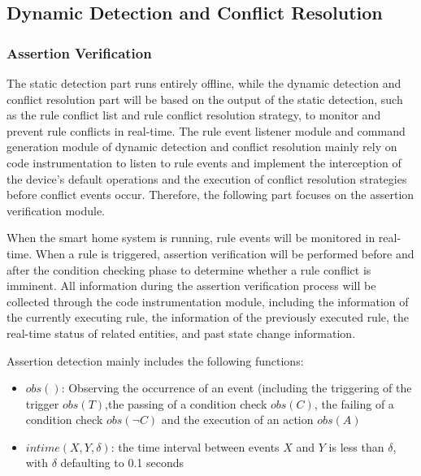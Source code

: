 \subsection{Dynamic Detection and Conflict Resolution}
\subsubsection{Assertion Verification}
The static detection part runs entirely offline, while the dynamic detection and conflict resolution part will be based on the output of the static detection, such as the rule conflict list and rule conflict resolution strategy, to monitor and prevent rule conflicts in real-time. The rule event listener module and command generation module of dynamic detection and conflict resolution mainly rely on code instrumentation to listen to rule events and implement the interception of the device's default operations and the execution of conflict resolution strategies before conflict events occur. Therefore, the following part focuses on the assertion verification module.

When the smart home system is running, rule events will be monitored in real-time. When a rule is triggered, assertion verification will be performed before and after the condition checking phase to determine whether a rule conflict is imminent. All information during the assertion verification process will be collected through the code instrumentation module, including the information of the currently executing rule, the information of the previously executed rule, the real-time status of related entities, and past state change information.

Assertion detection mainly includes the following functions:

\begin{itemize}
	\item $obs()$: Observing the occurrence of an event (including the triggering of the trigger $obs(T)$,the passing of a condition check $obs(C)$, the failing of a condition check $obs(\neg C)$ and the execution of an action $obs(A)$
	\item $intime(X,Y,\delta)$: the time interval between events $X$ and $Y$ is less than $\delta$, with $\delta$ defaulting to 0.1 seconds
\end{itemize}


